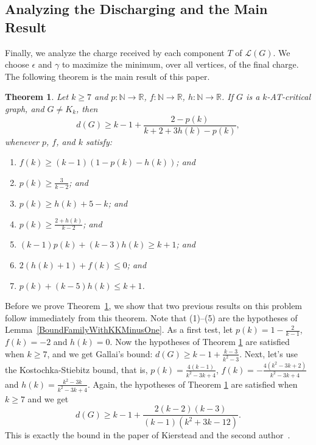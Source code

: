\documentclass[12pt]{article}
\theoremstyle{plain}
\newtheorem{thm}{Theorem}[section]
\theoremstyle{definition}
\theoremstyle{remark}
\newcommand{\fancy}[1]{\mathcal{#1}}
\newcommand{\IN}{\mathbb{N}}
\newcommand{\IR}{\mathbb{R}}
\newcommand{\T}{\fancy{T}}
\renewcommand{\L}{\fancy{L}}
\newcommand{\func}[3]{#1\colon #2 \rightarrow #3}
\begin{document}
\subsection{Analyzing the Discharging and the Main Result}
Finally, we analyze the charge received by each component $T$ of $\L(G)$.  We choose $\epsilon$ and $\gamma$ to maximize the minimum, over all vertices, of the final charge.  The following theorem is the main result of this paper.

\begin{thm}\label{UberTheorem}
	Let $k \ge 7$ and $\func{p}{\IN}{\IR}$, $\func{f}{\IN}{\IR}$, $\func{h}{\IN}{\IR}$.  If $G$ is a $k$-AT-critical graph, and $G\ne K_k$, then 
	\[d(G) \ge k-1 + \frac{2-p(k)}{k+2 + 3h(k) - p(k)},\]
	whenever $p$, $f$, and $k$ satisfy:
	\begin{enumerate}
	\item $f(k) \ge (k-1)(1- p(k) - h(k))$; and	
	    \item $p(k) \ge \frac{3}{k-2}$; and
		\item $p(k) \ge h(k) + 5 - k$; and
		\item $p(k) \ge \frac{2+h(k)}{k-2}$; and
		\item $(k-1)p(k) + (k-3)h(k) \ge k+1$; and
		\item $2(h(k) + 1) + f(k) \le 0$; and
		\item $p(k) + (k-5)h(k) \le k+1$.
	\end{enumerate}
\end{thm}

Before we prove Theorem~\ref{UberTheorem}, we show that two previous results on this problem follow immediately from this 
theorem.  
Note that (1)--(5) are the hypotheses of Lemma~\ref{BoundFamilyWithKKMinusOne}.
%
As a first test, let $p(k) = 1 - \frac{2}{k-1}$, $f(k) = -2$ and $h(k) = 0$.  Now the hypotheses of Theorem \ref{UberTheorem} are satisfied when $k\ge7$, and we get Gallai's bound: $d(G) \ge k-1 + \frac{k-3}{k^2-3}$. 
Next, let's use the Kostochka-Stiebitz bound, that is, $p(k) = \frac{4(k-1)}{k^2 - 3k + 4}$, $f(k) = -\frac{4(k^2-3k+2)}{k^2-3k+4}$ and $h(k) = \frac{k^2 - 3k}{k^2-3k+4}$.  Again, the hypotheses of Theorem \ref{UberTheorem} are satisfied when $k \ge 7$ and we get
\[d(G) \ge k-1 + \frac{2(k-2)(k-3)}{(k-1)(k^2 + 3k - 12)}.\]
This is exactly the bound in the paper of Kierstead and the second author~\cite{OreVizing}.  
\end{document}
